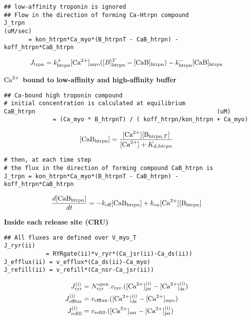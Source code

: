 \begin{verbatim}
## low-affinity troponin is ignored
## Flow in the direction of forming Ca-Htrpn compound
J_trpn                                                            (uM/sec)
       = kon_htrpn*Ca_myo*(B_htrpnT - CaB_htrpn) - koff_htrpn*CaB_htrpn 
\end{verbatim}
\begin{equation}
  \label{eq:15}
  J_{\text{trpn}} = k^+_{\text{htrpn}} [{\text{Ca}^{2+}}]_{\text{myo}}([B]^T_{\text{htrpn}}-[{\text{CaB}}]_{\text{htrpn}}) - k^-_{\text{htrpn}}[{\text{CaB}}]_{\text{htrpn}}
\end{equation}

{\bf ${\text{Ca}^{2+}}$ bound to low-affinity and high-affinity buffer}
\begin{verbatim}
## Ca-bound high troponin compound 
# initial concentration is calculated at equilibrium
CaB_htrpn                                                    (uM)
              = (Ca_myo * B_htrpnT) / ( koff_htrpn/kon_htrpn + Ca_myo)
\end{verbatim}
\begin{eqnarray}
  \label{eq:1}
  [{\text{CaB}}_{\text{htrpn}}] = \frac{[{\text{Ca}^{2+}}][{\text{B}}_{{\text{htrpn}},T}]}{[{\text{Ca}^{2+}}]+K_{d,htrpn}}
\end{eqnarray}

\begin{verbatim}
# then, at each time step
# the flux in the direction of forming compound CaB_htrpn is
J_trpn = kon_htrpn*Ca_myo*(B_htrpnT - CaB_htrpn) - koff_htrpn*CaB_htrpn
\end{verbatim}
\begin{eqnarray}
  \label{eq:2}
  \frac{d[{\text{CaB}}_{\text{htrpn}}]}{dt} = - k_{\text{off}}[{\text{CaB}}_{\text{htrpn}}] + k_{\text{on}}[{\text{Ca}^{2+}}][{\text{B}}_{\text{htrpn}}]
\end{eqnarray}

{\bf Inside each release site (CRU)}
\begin{verbatim}
## All fluxes are defined over V_myo_T
J_ryr(ii) 
            = RYRgate(ii)*v_ryr*(Ca_jsr(ii)-Ca_ds(ii))
J_efflux(ii) = v_efflux*(Ca_ds(ii)-Ca_myo)
J_refill(ii) = v_refill*(Ca_nsr-Ca_jsr(ii)) 
\end{verbatim}
\begin{equation}
  \label{eq:19}
  \begin{split}
    J_{\text{ryr}}^{\text{(i)}} &= N_{\text{ryr}}^{\text{open}} .v_{\text{ryr}}.([{\text{Ca}^{2+}}]_{\text{jsr}}^{\text{(i)}}-[{\text{Ca}^{2+}}]_{\text{ds}}^{\text{(i)}})\\
    J_{\text{efflux}}^{\text{(i)}} &= v_{\text{efflux}} . ([{\text{Ca}^{2+}}]_{\text{ds}}^{\text{(i)}}-[{\text{Ca}^{2+}}]_{\text{myo}}) \\
    J_{\text{refill}}^{\text{(i)}} &= v_{\text{refill}} . ([{\text{Ca}^{2+}}]_{\text{nsr}}-[{\text{Ca}^{2+}}]_{\text{jsr}}^{\text{(i)}})
  \end{split}
\end{equation}

